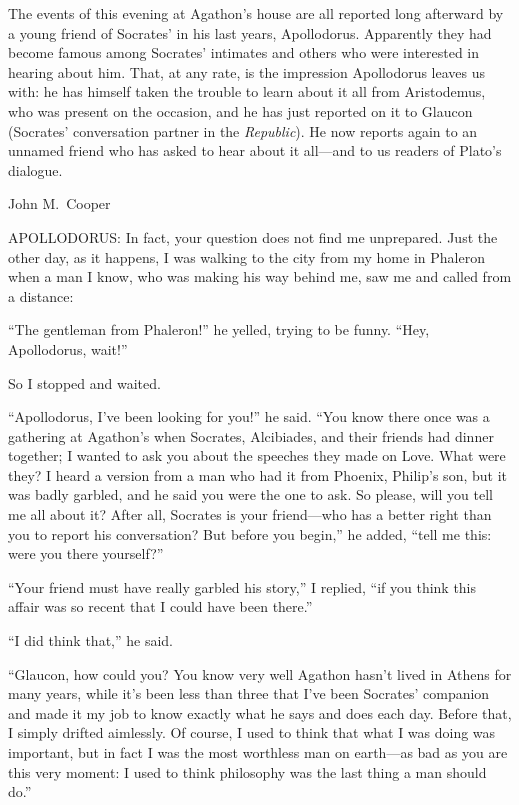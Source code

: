 The events of this evening at Agathon's house are all reported long
afterward by a young friend of Socrates' in his last years,
Apollodorus. Apparently they had become famous among Socrates'
intimates and others who were interested in hearing about him.
That, at any rate, is the impression Apollodorus leaves us with:
he has himself taken the trouble to learn about it all from
Aristodemus, who was present on the occasion, and he has just
reported on it to Glaucon (Socrates' conversation partner in the
{\em Republic}). He now reports again to an unnamed friend who has
asked to hear about it all---and to us readers of Plato's
dialogue.

\hfill John M.~Cooper\par
\stopchapter

\startchapter[title=Symposium]

APOLLODORUS: In fact, your question does not find me
unprepared. Just the other day, as it happens, I was walking to the city
from my home in Phaleron when a man I know, who was making his way
behind me, saw me and called from a distance:

“The gentleman from Phaleron!” he yelled, trying to be funny. “Hey,
Apollodorus, wait!”

So I stopped and waited.

“Apollodorus, I've been looking for you!” he said. “You know
there once was a gathering at Agathon's when Socrates, Alcibiades, and
their friends had dinner together; I wanted to ask you about the
speeches they made on Love. What were they? I heard a version from a man
who had it from Phoenix, Philip's son, but it was badly garbled, and he
said you were the one to ask. So please, will you tell me all about it?
After all, Socrates is your friend---who has a better right than you to
report his conversation? But before you begin,” he added, “tell me this:
were you there yourself?”

“Your friend must have really garbled his story,” I replied, “if
you think this affair was so recent that I could have been there.”

“I did think that,” he said.

“Glaucon, how could you? You know very well Agathon hasn't lived in
Athens for many years, while it's been less than three that I've been
Socrates' companion and made it my job to know exactly what he says
and does each day. Before that, I simply drifted
aimlessly. Of course, I used to think that what I was doing was
important, but in fact I was the most worthless man on earth---as bad as
you are this very moment: I used to think philosophy was the last thing
a man should do.”

